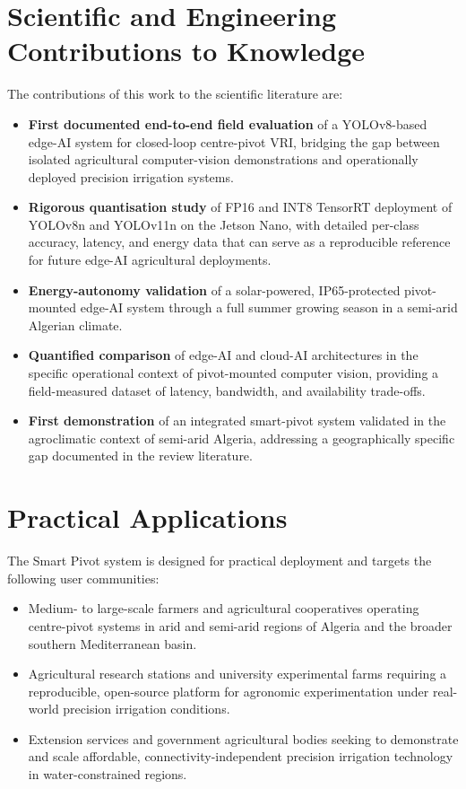 \documentclass[12pt,a4paper]{report}
\begin{document}
\section{Scientific and Engineering Contributions to Knowledge}

The contributions of this work to the scientific literature are:

\begin{itemize}
    \item \textbf{First documented end-to-end field evaluation} of a YOLOv8-based edge-AI system for closed-loop centre-pivot VRI, bridging the gap between isolated agricultural computer-vision demonstrations and operationally deployed precision irrigation systems.
    \item \textbf{Rigorous quantisation study} of FP16 and INT8 TensorRT deployment of YOLOv8n and YOLOv11n on the Jetson Nano, with detailed per-class accuracy, latency, and energy data that can serve as a reproducible reference for future edge-AI agricultural deployments.
    \item \textbf{Energy-autonomy validation} of a solar-powered, IP65-protected pivot-mounted edge-AI system through a full summer growing season in a semi-arid Algerian climate.
    \item \textbf{Quantified comparison} of edge-AI and cloud-AI architectures in the specific operational context of pivot-mounted computer vision, providing a field-measured dataset of latency, bandwidth, and availability trade-offs.
    \item \textbf{First demonstration} of an integrated smart-pivot system validated in the agroclimatic context of semi-arid Algeria, addressing a geographically specific gap documented in the review literature.
\end{itemize}

\section{Practical Applications}

The Smart Pivot system is designed for practical deployment and targets the following user communities:
\begin{itemize}
    \item Medium- to large-scale farmers and agricultural cooperatives operating centre-pivot systems in arid and semi-arid regions of Algeria and the broader southern Mediterranean basin.
    \item Agricultural research stations and university experimental farms requiring a reproducible, open-source platform for agronomic experimentation under real-world precision irrigation conditions.
    \item Extension services and government agricultural bodies seeking to demonstrate and scale affordable, connectivity-independent precision irrigation technology in water-constrained regions.
\end{itemize}
\end{document}
